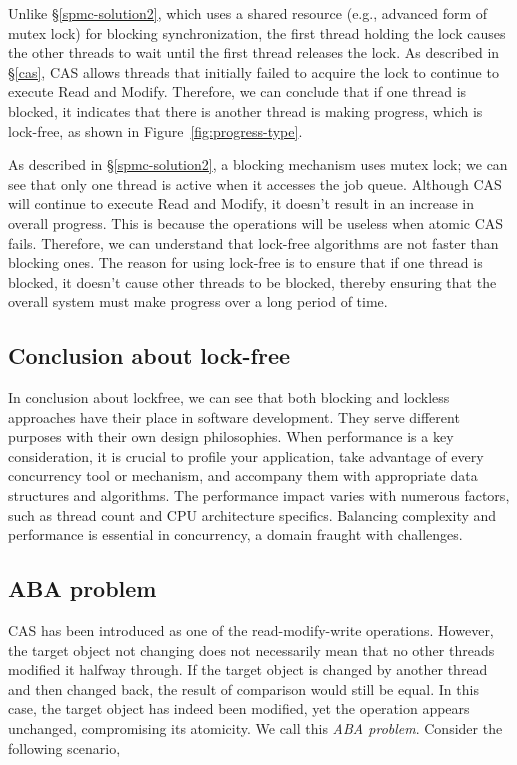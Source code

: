 \documentclass[fontsize=10pt, oneside]{scrartcl}
\newcommand{\fig}[1]{Figure~\ref{#1}}
\newcommand{\introduce}[1]{\textit{#1}}
\newcommand{\secref}[1]{\hyperref[#1]{\textsc{\S}\ref*{#1}}}
\begin{document}
Unlike \secref{spmc-solution2}, 
which uses a shared resource (e.g., advanced form of mutex lock) for blocking synchronization, 
the first thread holding the lock causes the other threads to wait until the first thread releases the lock. 
As described in \secref{cas}, \textsc{CAS} allows threads that initially failed to acquire the lock to continue to execute Read and Modify. 
Therefore, we can conclude that if one thread is blocked, 
it indicates that there is another thread is making progress, 
which is lock-free, as shown in \fig{fig:progress-type}.

As described in \secref{spmc-solution2}, a blocking mechanism uses mutex lock; 
we can see that only one thread is active when it accesses the job queue. 
Although \textsc{CAS} will continue to execute Read and Modify, 
it doesn't result in an increase in overall progress. 
This is because the operations will be useless when atomic \textsc{CAS} fails. 
Therefore, we can understand that lock-free algorithms are not faster than blocking ones. 
The reason for using lock-free is to ensure that if one thread is blocked, 
it doesn't cause other threads to be blocked, 
thereby ensuring that the overall system must make progress over a long period of time.

\subsection{Conclusion about lock-free}
In conclusion about lockfree, 
we can see that both blocking and lockless approaches have their place in software development. 
They serve different purposes with their own design philosophies. 
When performance is a key consideration, it is crucial to profile your application, 
take advantage of every concurrency tool or mechanism, and accompany them with appropriate data structures and algorithms. 
The performance impact varies with numerous factors, such as thread count and CPU architecture specifics. 
Balancing complexity and performance is essential in concurrency, 
a domain fraught with challenges.

\subsection{ABA problem}
CAS has been introduced as one of the read-modify-write operations.
However, the target object not changing does not necessarily mean that no other threads modified it halfway through.
If the target object is changed by another thread and then changed back, the result of comparison would still be equal.
In this case, the target object has indeed been modified, yet the operation appears unchanged, compromising its atomicity.
We call this \introduce{ABA problem}.
Consider the following scenario,
\end{document}
